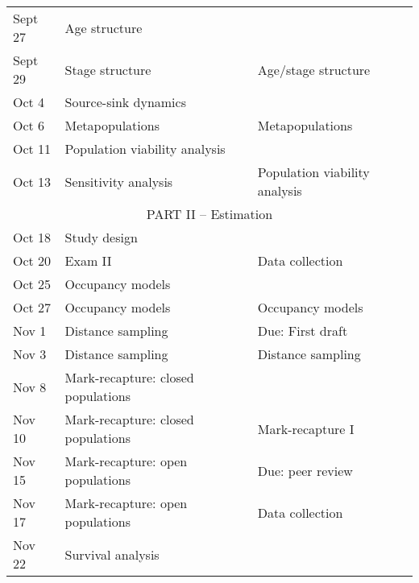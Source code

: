 \documentclass[12pt]{article}
\begin{document}
\begin{center}
\begin{tabular}[c]{lll}
\hline
Sept 27    & Age structure                      &                                      \\
Sept 29    & Stage structure                    & Age/stage structure                  \\
\hline
Oct 4      & Source-sink dynamics               &                                      \\
Oct 6      & Metapopulations                    & Metapopulations                      \\
\hline
Oct 11     & Population viability analysis      &                                      \\
Oct 13     & Sensitivity analysis               & Population viability analysis        \\
\hline
           \multicolumn{3}{c}{PART II -- Estimation}                                   \\
\hline
Oct 18     & Study design                       &                                      \\
Oct 20     & Exam II                            & Data collection                      \\
\hline
Oct 25     & Occupancy models                   &                                      \\
Oct 27     & Occupancy models                   & Occupancy models                     \\
\hline
Nov 1      & Distance sampling                  & Due: First draft                     \\
Nov 3      & Distance sampling                  & Distance sampling                    \\
\hline
Nov 8      & Mark-recapture: closed populations &                                      \\
Nov 10     & Mark-recapture: closed populations & Mark-recapture I                     \\
\hline
Nov 15     & Mark-recapture: open populations   & Due: peer review                     \\
Nov 17     & Mark-recapture: open populations   & Data collection                    \\
\hline
Nov 22     & Survival analysis                  &                    \\

\end{tabular}
\end{center}
\end{document}
